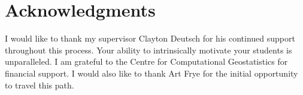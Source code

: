 
\chapter*{Acknowledgments}

I would like to thank my supervisor Clayton Deutsch for his continued support throughout this process. Your ability to intrinsically motivate your students is unparalleled. I am grateful to the Centre for Computational Geostatistics for financial support. I would also like to thank Art Frye for the initial opportunity to travel this path.